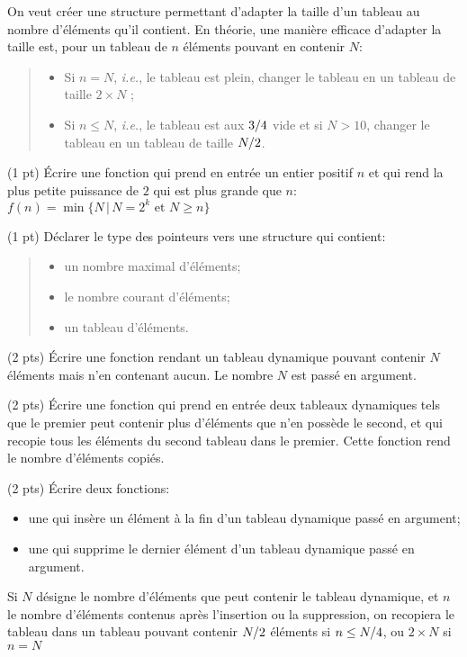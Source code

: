 
On veut cr{\'e}er une structure permettant d'adapter la taille d'un
tableau au nombre d'{\'e}l{\'e}ments qu'il contient. En th{\'e}orie, une mani{\`e}re
efficace d'adapter la taille est, pour un tableau de $n$ {\'e}l{\'e}ments
pouvant en contenir $N$:
\begin{quote}
  \begin{itemize}\itemsep=-3pt
  \item Si $n = N$, \textit{i.e.}, le tableau est plein, changer le
    tableau en un tableau de taille $2\times N$ ;
  \item Si $n\le N$, \textit{i.e.}, le tableau est aux $\nicefrac 34$
    vide et si $N>10$, changer le tableau en un tableau de taille
    $\nicefrac N 2$.
  \end{itemize}
\end{quote}


\question (1 pt) {\'E}crire une fonction qui prend en entr{\'e}e un entier
positif $n$ et qui rend la plus petite puissance de $2$ qui est plus
grande que $n$: $f(n) = \min \lbrace N \,\vert\, N=2^k \text{ et } N\ge n\rbrace$

\question (1 pt) D{\'e}clarer le type  des pointeurs vers une
structure  qui contient:
\begin{quote}
  \begin{itemize}\setlength\itemsep {-3pt}
  \item un nombre maximal d'{\'e}l{\'e}ments;
  \item le nombre courant d'{\'e}l{\'e}ments;
  \item un tableau  d'{\'e}l{\'e}ments.
  \end{itemize}
\end{quote}

\question (2 pts) {\'E}crire une fonction rendant un tableau dynamique
pouvant contenir $N$ {\'e}l{\'e}ments mais n'en contenant aucun. Le nombre $N$
est pass{\'e} en argument.

\question (2 pts) {\'E}crire une fonction qui prend en entr{\'e}e deux
tableaux dynamiques tels que le premier peut contenir plus d'{\'e}l{\'e}ments
que n'en poss{\`e}de le second, et qui recopie tous les {\'e}l{\'e}ments du second
tableau dans le premier. Cette fonction rend le nombre d'{\'e}l{\'e}ments
copi{\'e}s.


\question (2 pts) {\'E}crire deux fonctions:
\begin{itemize}
\item une qui ins{\`e}re un {\'e}l{\'e}ment {\`a} la fin d'un tableau dynamique pass{\'e}
  en argument;
\item une qui supprime le dernier {\'e}l{\'e}ment d'un tableau dynamique pass{\'e}
  en argument.
\end{itemize}
Si $N$ d{\'e}signe le nombre d'{\'e}l{\'e}ments que peut contenir le tableau
dynamique, et $n$ le nombre d'{\'e}l{\'e}ments contenus apr{\`e}s l'insertion ou
la suppression, on recopiera le tableau dans un tableau pouvant
contenir $\nicefrac N2$ {\'e}l{\'e}ments si $n\le \nicefrac N4$, ou $2\times
N$ si $n=N$


